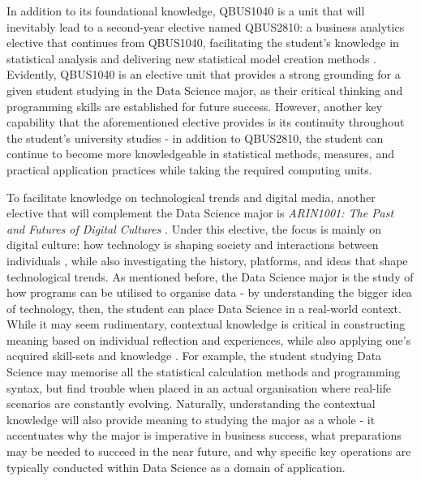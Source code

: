 In addition to its foundational knowledge, QBUS1040 is a unit that will inevitably lead to a second-year elective named QBUS2810: a business analytics elective that continues from QBUS1040, facilitating the student’s knowledge in statistical analysis and delivering new statistical model creation methods \cite{Usyd6}. Evidently, QBUS1040 is an elective unit that provides a strong grounding for a given student studying in the Data Science major, as their critical thinking and programming skills are established for future success. However, another key capability that the aforementioned elective provides is its continuity throughout the student’s university studies - in addition to QBUS2810, the student can continue to become more knowledgeable in statistical methods, measures, and practical application practices while taking the required computing units. 


To facilitate knowledge on technological trends and digital media, another elective that will complement the Data Science major is \textit{ARIN1001: The Past and Futures of Digital Cultures} \cite{Usyd2}. Under this elective, the focus is mainly on digital culture: how technology is shaping society and interactions between individuals \cite{Insights}, while also investigating the history, platforms, and ideas that shape technological trends. As mentioned before, the Data Science major is the study of how programs can be utilised to organise data - by understanding the bigger idea of technology, then, the student can place Data Science in a real-world context. While it may seem rudimentary, contextual knowledge is critical in constructing meaning based on individual reflection and experiences, while also applying one’s acquired skill-sets and knowledge \cite{JBCN}. For example, the student studying Data Science may memorise all the statistical calculation methods and programming syntax, but find trouble when placed in an actual organisation where real-life scenarios are constantly evolving. Naturally, understanding the contextual knowledge will also provide meaning to studying the major as a whole - it accentuates why the major is imperative in business success, what preparations may be needed to succeed in the near future, and why specific key operations are typically conducted within Data Science as a domain of application.


